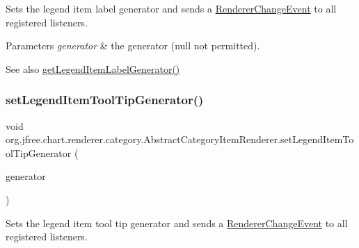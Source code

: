 Sets the legend item label generator and sends a \mbox{\hyperlink{}{Renderer\+Change\+Event}} to all registered listeners.


\begin{DoxyParams}{Parameters}
{\em generator} & the generator ({\ttfamily null} not permitted).\\
\hline
\end{DoxyParams}
\begin{DoxySeeAlso}{See also}
\mbox{\hyperlink{classorg_1_1jfree_1_1chart_1_1renderer_1_1category_1_1_abstract_category_item_renderer_a09bd5701cd60505b3463b9e59a3ae70a}{get\+Legend\+Item\+Label\+Generator()}} 
\end{DoxySeeAlso}
\mbox{\label{classorg_1_1jfree_1_1chart_1_1renderer_1_1category_1_1_abstract_category_item_renderer_aea6efd422135015d90c2ced64c82090d}} 
\subsubsection{\texorpdfstring{set\+Legend\+Item\+Tool\+Tip\+Generator()}{setLegendItemToolTipGenerator()}}
{\footnotesize\ttfamily void org.\+jfree.\+chart.\+renderer.\+category.\+Abstract\+Category\+Item\+Renderer.\+set\+Legend\+Item\+Tool\+Tip\+Generator (\begin{DoxyParamCaption}\item[{\mbox{\hyperlink{interfaceorg_1_1jfree_1_1chart_1_1labels_1_1_category_series_label_generator}{Category\+Series\+Label\+Generator}}}]{generator }\end{DoxyParamCaption})}

Sets the legend item tool tip generator and sends a \mbox{\hyperlink{}{Renderer\+Change\+Event}} to all registered listeners.


